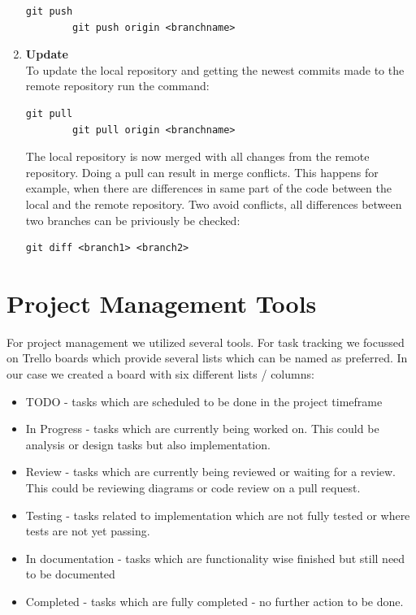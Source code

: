 \begin{enumerate}
    \begin{lstlisting}[label={lst:lstlisting2}]
		git push
		git push origin <branchname>
    \end{lstlisting}
    \item \textbf{Update} \\
    To update the local repository and getting the newest commits made to the remote repository run the command:
    \begin{lstlisting}[label={lst:lstlisting2}]
		git pull
		git pull origin <branchname>
    \end{lstlisting}
    The local repository is now merged with all changes from the remote repository.
    Doing a pull can result in merge conflicts.
    This happens for example, when there are differences in same part of the code between the local and the remote
    repository.
    Two avoid conflicts, all differences between two branches can be priviously be checked: \\
    \begin{lstlisting}[label={lst:lstlisting2}]
		git diff <branch1> <branch2>
    \end{lstlisting}

\end{enumerate}

\section{Project Management Tools}\label{sec:project-management-tools}

For project management we utilized several tools.
For task tracking we focussed on Trello boards which provide several lists which can be named as preferred.
In our case we created a board with six different lists / columns:

\begin{itemize}
    \item TODO - tasks which are scheduled to be done in the project timeframe
    \item In Progress - tasks which are currently being worked on.
            This could be analysis or design tasks but also implementation.
    \item Review - tasks which are currently being reviewed or waiting for a review.
            This could be reviewing diagrams or code review on a pull request.
    \item Testing - tasks related to implementation which are not fully tested or where tests are not yet passing.
    \item In documentation - tasks which are functionality wise finished but still need to be documented
    \item Completed - tasks which are fully completed - no further action to be done.
\end{itemize}

